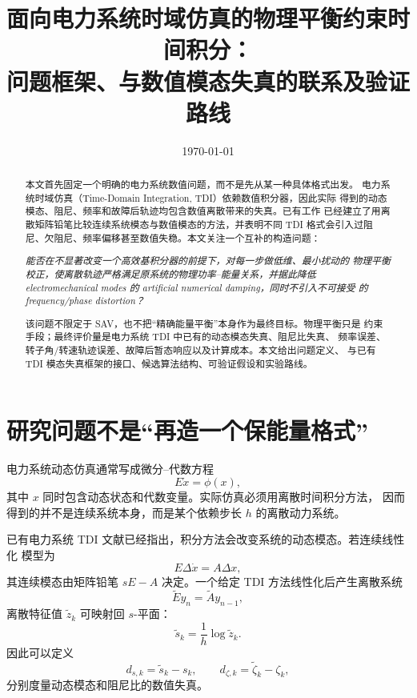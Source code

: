 \documentclass[UTF8,11pt,a4paper]{ctexart}
\title{面向电力系统时域仿真的物理平衡约束时间积分：\\
问题框架、与数值模态失真的联系及验证路线}
\author{}
\date{\today}
\begin{document}
\maketitle

\begin{abstract}
本文首先固定一个明确的电力系统数值问题，而不是先从某一种具体格式出发。
电力系统时域仿真（Time-Domain Integration, TDI）依赖数值积分器，因此实际
得到的动态模态、阻尼、频率和故障后轨迹均包含数值离散带来的失真。已有工作
已经建立了用离散矩阵铅笔比较连续系统模态与数值模态的方法，并表明不同 TDI
格式会引入过阻尼、欠阻尼、频率偏移甚至数值失稳。本文关注一个互补的构造问题：

\emph{能否在不显著改变一个高效基积分器的前提下，对每一步做低维、最小扰动的
物理平衡校正，使离散轨迹严格满足原系统的物理功率--能量关系，并据此降低
electromechanical modes 的 artificial numerical damping，同时不引入不可接受
的 frequency/phase distortion？}

该问题不限定于 SAV，也不把“精确能量平衡”本身作为最终目标。物理平衡只是
约束手段；最终评价量是电力系统 TDI 中已有的动态模态失真、阻尼比失真、
频率误差、转子角/转速轨迹误差、故障后暂态响应以及计算成本。本文给出问题定义、
与已有 TDI 模态失真框架的接口、候选算法结构、可验证假设和实验路线。
\end{abstract}

\section{研究问题不是“再造一个保能量格式”}

电力系统动态仿真通常写成微分--代数方程
\begin{equation}
  E\dot x=\phi(x),
  \label{eq:dae}
\end{equation}
其中 \(x\) 同时包含动态状态和代数变量。实际仿真必须用离散时间积分方法，
因而得到的并不是连续系统本身，而是某个依赖步长 \(h\) 的离散动力系统。

已有电力系统 TDI 文献已经指出，积分方法会改变系统的动态模态。若连续线性化
模型为
\begin{equation}
  E\Delta\dot x=A\Delta x,
  \label{eq:linearized}
\end{equation}
其连续模态由矩阵铅笔 \(sE-A\) 决定。一个给定 TDI 方法线性化后产生离散系统
\begin{equation}
  \widetilde E y_n=\widetilde A y_{n-1},
\end{equation}
离散特征值 \(\widetilde z_k\) 可映射回 \(s\)-平面：
\begin{equation}
  \widetilde s_k=\frac{1}{h}\log \widetilde z_k.
\end{equation}
因此可以定义
\begin{equation}
  d_{s,k}=\widetilde s_k-s_k,
  \qquad
  d_{\zeta,k}=\widetilde\zeta_k-\zeta_k,
  \label{eq:modal-distortion}
\end{equation}
分别度量动态模态和阻尼比的数值失真。
\end{document}

